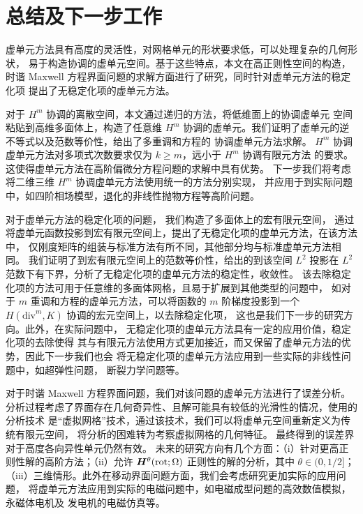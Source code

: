 \chapter{总结及下一步工作}
\label{chap:conclusion}

虚单元方法具有高度的灵活性，对网格单元的形状要求低，可以处理复杂的几何形状，
易于构造协调的虚单元空间。基于这些特点，本文在高正则性空间的构造，
时谐 Maxwell 方程界面问题的求解方面进行了研究，同时针对虚单元方法的稳定化项
提出了无稳定化项的虚单元方法。

对于 $H^m$ 协调的离散空间，本文通过递归的方法，将低维面上的协调虚单元
空间粘贴到高维多面体上，构造了任意维 $H^m$
协调的虚单元。我们证明了虚单元的逆不等式以及范数等价性，给出了多重调和方程的
协调虚单元方法求解。
$H^m$ 协调虚单元方法对多项式次数要求仅为 $k\geq m$，远小于 $H^m$ 协调有限元方法
的要求。这使得虚单元方法在高阶偏微分方程问题的求解中具有优势。
下一步我们将考虑将二维三维 $H^m$ 协调虚单元方法使用统一的方法分别实现，
并应用于到实际问题中，如四阶相场模型，退化的非线性抛物方程等高阶问题。

对于虚单元方法的稳定化项的问题，
我们构造了多面体上的宏有限元空间，
通过将虚单元函数投影到宏有限元空间上，提出了无稳定化项的虚单元方法，在该方法中，
仅刚度矩阵的组装与标准方法有所不同，其他部分均与标准虚单元方法相同。
我们证明了到宏有限元空间上的范数等价性，给出的到该空间 $L^2$
投影在 $L^2$ 范数下有下界，分析了无稳定化项的虚单元方法的稳定性，收敛性。
该去除稳定化项的方法可用于任意维的多面体网格，且易于扩展到其他类型的问题中，
如对于 $m$ 重调和方程的虚单元方法，可以将函数的 $m$ 
阶梯度投影到一个 $H(\mathrm{div}^m, K)$ 协调的宏元空间上，以去除稳定化项，
这也是我们下一步的研究方向。此外，在实际问题中，
无稳定化项的虚单元方法具有一定的应用价值，稳定化项的去除使得
其与有限元方法使用方式更加接近，而又保留了虚单元方法的优势，因此下一步我们也会
将无稳定化项的虚单元方法应用到一些实际的非线性问题中，如超弹性问题，
断裂力学问题等。

对于时谐 Maxwell 方程界面问题，我们对该问题的虚单元方法进行了误差分析。
分析过程考虑了界面存在几何奇异性、且解可能具有较低的光滑性的情况，使用的分析技术
是“虚拟网格”技术，通过该技术，我们可以将虚单元空间重新定义为传统有限元空间，
将分析的困难转为考察虚拟网格的几何特征。
最终得到的误差界对于高度各向异性单元仍然有效。
未来的研究方向有几个方面：（i）针对更高正则性解的高阶方法；（ii）允许
$\boldsymbol{H}^{\theta}(\mathrm{rot};\Omega)$ 正则性的解的分析，其中 $\theta \in (0,
1/2]$；（iii）三维情形。此外在移动界面问题方面，我们会考虑研究更加实际的应用问题，
将虚单元方法应用到实际的电磁问题中，如电磁成型问题的高效数值模拟，永磁体电机及
发电机的电磁仿真等。


